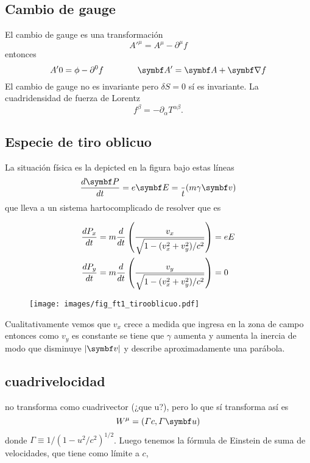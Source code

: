 \documentclass[10pt,oneside]{CBFT_book}
\begin{document}
\subsection{Cambio de gauge}

El cambio de gauge es una transformación 
\[
	A'^\mu = A^\mu - \partial^\mu f
\]
entonces 
\[
	A'0 = \phi - \partial^0 f \qquad \qquad \vb{A}' = \vb{A} + \Nabla f
\]
El cambio de gauge no es invariante pero $\delta S = 0$ sí es invariante.
La cuadridensidad de fuerza de Lorentz 
\[
	f^\beta = - \partial_\alpha T^{\alpha\beta}.
\]

\subsection{Especie de tiro oblicuo}

La situación física es la depicted en la figura bajo estas líneas
\[
	\dtot{\vb{P}}{t} = e\vb{E} = \frac{}{t}( m \gamma \vb{v} )
\]
que lleva a un sistema hartocomplicado de resolver que es 

\begin{align*}
 \frac{d^{\hspace{-0.05em}} {P_x}}{d {t}^{\hspace{-0.05em}}} &= m \frac{d^{\hspace{-0.05em}} {}}{d {t}^{\hspace{-0.05em}}}\left( \frac{v_x}{ \sqrt{ 1 - (v_x^2 + v_y^2)/c^2 } }\right) = eE \\
 \frac{d^{\hspace{-0.05em}} {P_y}}{d {t}^{\hspace{-0.05em}}} &= m \frac{d^{\hspace{-0.05em}} {}}{d {t}^{\hspace{-0.05em}}}\left( \frac{v_y}{ \sqrt{ 1 - (v_x^2 + v_y^2)/c^2 } }\right) =0 \\
\end{align*}


\begin{figure}[htb]
	\begin{center}
	\texttt{[image: images/fig\_ft1\_tirooblicuo.pdf]}	 
	\end{center}
	\caption{}
\end{figure} 

Cualitativamente vemos que $v_x$ crece a medida que ingresa en la zona de campo  entonces como $v_y$ es
constante se tiene que $\gamma$ aumenta y aumenta la inercia de modo que disminuye $|\vb{v}|$ y describe
aproximadamente una parábola.

\subsection{cuadrivelocidad}

 no transforma como cuadrivector (¿que u?), pero lo que sí transforma así es
\[
	W^\mu = ( \Gamma c , \Gamma \vb{u} ) 
\]
donde $ \Gamma \equiv 1/( 1 - u^2/c^2)^{1/2}$. Luego tenemos la fórmula de Einstein de suma de velocidades,
que tiene como límite a $c$,
\end{document}
